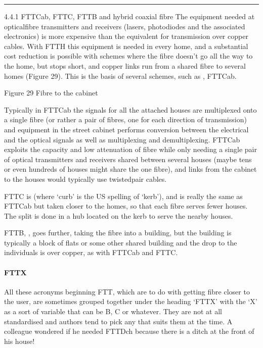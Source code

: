 \documentclass[letterpaper,10pt,english]{sphinxmanual}
\let\sphinxpxdimen\pdfpxdimen\else\newdimen\sphinxpxdimen
\begin{document}
\bigskip\hrule\bigskip


4.4.1 FTTCab, FTTC, FTTB and hybrid coaxial fibre The equipment needed at optical\sphinxhyphen{}fibre transmitters and receivers (lasers, photodiodes and the associated electronics) is more expensive than the equivalent for transmission over copper cables. With FTTH this equipment is needed in every home, and a substantial cost reduction is possible with schemes where the fibre doesn’t go all the way to the home, but stops short, and copper links run from a shared fibre to several homes (Figure 29). This is
the basis of several schemes, such as , FTTCab.

\sphinxincludegraphics[width=511\sphinxpxdimen,height=157\sphinxpxdimen]{{companionhighres_002i}.jpg}

Figure 29 Fibre to the cabinet

Typically in FTTCab the signals for all the attached houses are multiplexed onto a single fibre (or rather a pair of fibres, one for each direction of transmission) and equipment in the street cabinet performs conversion between the electrical and the optical signals as well as multiplexing and demultiplexing. FTTCab exploits the capacity and low attenuation of fibre while only needing a single pair of optical transmitters and receivers shared between several houses (maybe tens or even hundreds
of houses might share the one fibre), and links from the cabinet to the houses would typically use twisted\sphinxhyphen{}pair cables.

FTTC is  (where ‘curb’ is the US spelling of ‘kerb’), and is really the same as FTTCab but taken closer to the homes, so that each fibre serves fewer houses. The split is done in a hub located on the kerb to serve the nearby houses.

FTTB, , goes further, taking the fibre into a building, but the building is typically a block of flats or some other shared building and the drop to the individuals is over copper, as with FTTCab and FTTC.


\paragraph{FTTX}
\label{\detokenize{content/session_00/Part_00_04:FTTX}}
All these acronyms beginning FTT, which are to do with getting fibre closer to the user, are sometimes grouped together under the heading ‘FTTX’ \textendash{} with the ‘X’ as a sort of variable that can be B, C or whatever. They are not at all standardised and authors tend to pick any that suits them at the time. A colleague wondered if he needed FTTDch because there is a ditch at the front of his house!
\end{document}
